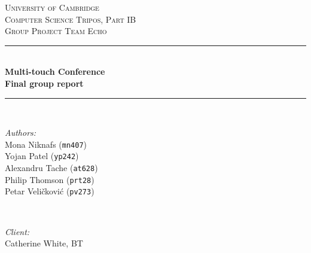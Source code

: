 \documentclass[12p, a4paper, onecolumn]{report}
\begin{document}
\begin{titlepage}

\newcommand{\HRule}{\rule{\linewidth}{0.5mm}} %
\clearpage
\vspace*{\fill}
\center %
 

\textsc{\LARGE University of Cambridge}\\[1.5cm] %
\textsc{\Large Computer Science Tripos, Part IB}\\[0.5cm] %
\textsc{\large Group Project Team Echo}\\[0.5cm] %


\HRule \\[0.4cm]
{ \huge \bfseries Multi-touch Conference}\\[0.4cm]
{ \huge \bfseries Final group report}\\[0.1cm] %
\HRule \\[1.5cm]
 

\begin{minipage}{0.4\textwidth}
\begin{flushleft} \large
\emph{Authors:}\\
Mona Niknafs (\texttt{mn407})\\
Yojan Patel (\texttt{yp242})\\
Alexandru Tache (\texttt{at628})\\
Philip Thomson (\texttt{prt28})\\
Petar Veli\v{c}kovi\'{c} (\texttt{pv273})\\
\end{flushleft}
\end{minipage}
~
\begin{minipage}{0.4\textwidth}
\begin{flushright} \large
\emph{Client:} \\
Catherine White, BT\\ 
\hfill \\
\hfill \\
\hfill \\
\hfill \\
\end{flushright}
\end{minipage}\\[4cm]


\end{titlepage}
\end{document}
